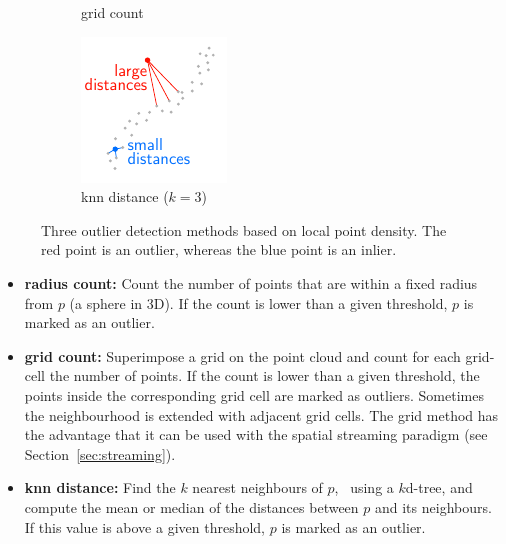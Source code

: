 \begin{figure}[htb]
\begin{subfigure}[b]{0.3\linewidth}
    \caption{grid count}
  \end{subfigure}
  \begin{subfigure}[b]{0.3\linewidth}
    \centering
    \includegraphics[width=\textwidth]{knn-distance.pdf}
    \caption{knn distance ($k=3$)}
  \end{subfigure}
\caption{Three outlier detection methods based on local point density. The red point is an outlier, whereas the blue point is an inlier.}%
\label{fig:outlier-detection}
\end{figure}

\begin{itemize}
  \item \textbf{radius count:} Count the number of points that are within a fixed radius from $p$ (a sphere in 3D). If the count is lower than a given threshold, $p$ is marked as an outlier.
  \item \textbf{grid count:} Superimpose a grid on the point cloud and count for each grid-cell the number of points. If the count is lower than a given threshold, the points inside the corresponding grid cell are marked as outliers. Sometimes the neighbourhood is extended with adjacent grid cells. The grid method has the advantage that it can be used with the spatial streaming paradigm (see Section~\ref{sec:streaming}).
  \item \textbf{knn distance:} Find the $k$ nearest neighbours of $p$, \eg\ using a $k$d-tree, and compute the mean or median of the distances between $p$ and its neighbours. If this value is above a given threshold, $p$ is marked as an outlier.
\end{itemize}

